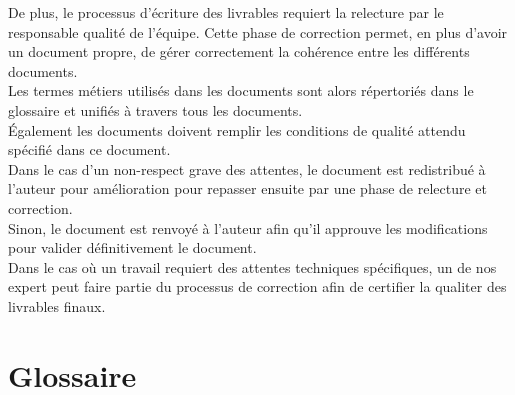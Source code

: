 De plus, le processus d'écriture des livrables requiert la relecture par le
responsable qualité de l'équipe. Cette phase de correction permet, en plus
d'avoir un document propre, de gérer correctement la cohérence entre les
différents documents. \\

Les termes métiers utilisés dans les documents sont alors répertoriés dans le
glossaire et unifiés à travers tous les documents. \\
Également les documents doivent remplir les conditions de qualité attendu
spécifié dans ce document. \\

Dans le cas d'un non-respect grave des attentes, le document est redistribué à
l'auteur pour amélioration pour repasser ensuite par une phase de relecture et
correction. \\
Sinon, le document est renvoyé à l'auteur afin qu'il approuve les modifications
pour valider définitivement le document. \\

Dans le cas où un travail requiert des attentes techniques spécifiques, un de
nos expert peut faire partie du processus de correction afin de certifier la
qualiter des livrables finaux. \\

\section{Glossaire}




